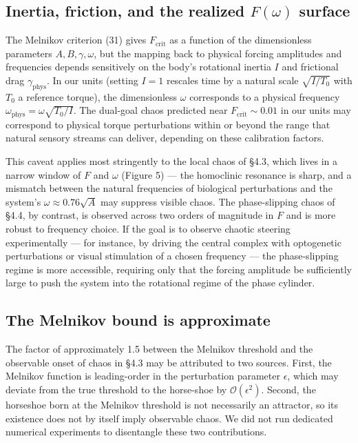 \documentclass[11pt]{article}
\begin{document}
\subsection{Inertia, friction, and the realized $F(\omega)$ surface}

The Melnikov criterion (31) gives $F_{\text{crit}}$ as a function of the dimensionless parameters $A, B, \gamma, \omega$, but the mapping back to physical forcing amplitudes and frequencies depends sensitively on the body's rotational inertia $I$ and frictional drag $\gamma_{\text{phys}}$. In our units (setting $I = 1$ rescales time by a natural scale $\sqrt{I/T_0}$ with $T_0$ a reference torque), the dimensionless $\omega$ corresponds to a physical frequency $\omega_{\text{phys}} = \omega\sqrt{T_0/I}$. The dual-goal chaos predicted near $F_{\text{crit}} \sim 0.01$ in our units may correspond to physical torque perturbations within or beyond the range that natural sensory streams can deliver, depending on these calibration factors.

This caveat applies most stringently to the local chaos of §4.3, which lives in a narrow window of $F$ and $\omega$ (Figure 5) --- the homoclinic resonance is sharp, and a mismatch between the natural frequencies of biological perturbations and the system's $\omega \approx 0.76\sqrt{A}$ may suppress visible chaos. The phase-slipping chaos of §4.4, by contrast, is observed across two orders of magnitude in $F$ and is more robust to frequency choice. If the goal is to observe chaotic steering experimentally --- for instance, by driving the central complex with optogenetic perturbations or visual stimulation of a chosen frequency --- the phase-slipping regime is more accessible, requiring only that the forcing amplitude be sufficiently large to push the system into the rotational regime of the phase cylinder.

\subsection{The Melnikov bound is approximate}

The factor of approximately 1.5 between the Melnikov threshold and the observable onset of chaos in §4.3 may be attributed to two sources. First, the Melnikov function is leading-order in the perturbation parameter $\epsilon$, which may deviate from the true threshold to the horse-shoe by $\mathcal{O}(\epsilon^{2})$. Second, the horseshoe born at the Melnikov threshold is not necessarily an attractor, so its existence does not by itself imply observable chaos. We did not run dedicated numerical experiments to disentangle these two contributions.
\end{document}

